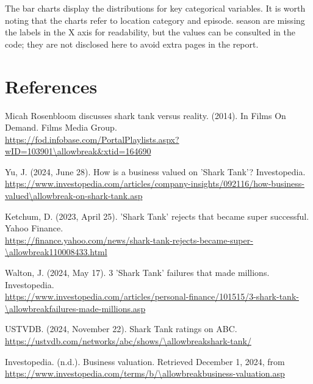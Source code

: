 \documentclass{article}
\begin{document}
The bar charts display the distributions for key categorical variables.
It is worth noting that the charts refer to location category and episode. season are missing the labels in the X axis for readability, but the values can be consulted in the code; they are not disclosed here to avoid extra pages in the report. 
    
\newpage %
\section*{References}

\raggedright
\vspace{0.5em}
Micah Rosenbloom discusses shark tank versus reality. (2014). In Films On Demand. Films Media Group. \\
\url{https://fod.infobase.com/PortalPlaylists.aspx?wID=103901\allowbreak&xtid=164690}

\vspace{0.5em}
Yu, J. (2024, June 28). How is a business valued on 'Shark Tank'? Investopedia. \\
\url{https://www.investopedia.com/articles/company-insights/092116/how-business-valued\allowbreak-on-shark-tank.asp}

\vspace{0.5em}
Ketchum, D. (2023, April 25). 'Shark Tank' rejects that became super successful. Yahoo Finance. \\
\url{https://finance.yahoo.com/news/shark-tank-rejects-became-super-\allowbreak110008433.html}

\vspace{0.5em}
Walton, J. (2024, May 17). 3 'Shark Tank' failures that made millions. Investopedia. \\
\url{https://www.investopedia.com/articles/personal-finance/101515/3-shark-tank-\allowbreakfailures-made-millions.asp}

\vspace{0.5em}
USTVDB. (2024, November 22). Shark Tank ratings on ABC. \\
\url{https://ustvdb.com/networks/abc/shows/\allowbreakshark-tank/}

\vspace{0.5em}
Investopedia. (n.d.). Business valuation. Retrieved December 1, 2024, from \\
\url{https://www.investopedia.com/terms/b/\allowbreakbusiness-valuation.asp}

\par
\end{document}
